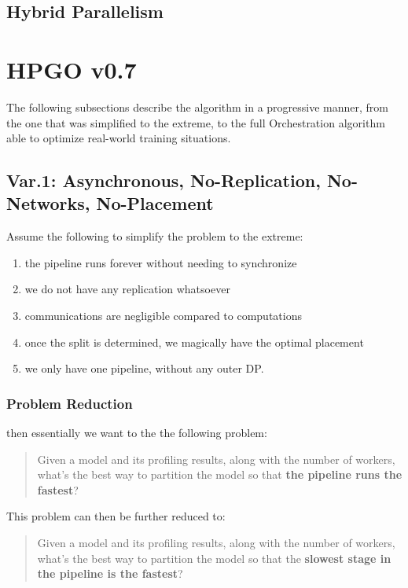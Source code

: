 \documentclass[12pt,letterpaper]{article}
\begin{document}
\subsection {Hybrid Parallelism}

\section {HPGO v0.7}

The following subsections describe the algorithm in a progressive manner, from the one that was simplified to the extreme, to the full Orchestration algorithm able to optimize real-world training situations.

\subsection{Var.1: Asynchronous, No-Replication, No-Networks, No-Placement}

Assume the following to simplify the problem to the extreme:
\begin{enumerate}
	\item the pipeline runs forever without needing to synchronize
	\item we do not have any replication whatsoever
	\item communications are negligible compared to computations
	\item once the split is determined, we magically have the optimal placement
	\item we only have one pipeline, without any outer DP.
\end{enumerate}

\subsubsection{Problem Reduction}

then essentially we want to the the following problem:

\begin{quote}
	Given a model and its profiling results, along with the number of workers, what's the best way to partition the model so that \textbf{the pipeline runs the fastest}?
\end{quote}

This problem can then be further reduced to:

\begin{quote}
	Given a model and its profiling results, along with the number of workers, what's the best way to partition the model so that the \textbf{slowest stage in the pipeline is the fastest}?
\end{quote}
\end{document}
